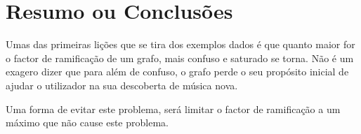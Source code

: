 



\section{Resumo ou Conclusões}

Umas das primeiras lições que se tira dos exemplos dados é que quanto maior for o factor de ramificação de um grafo, mais confuso e saturado se torna.
Não é um exagero dizer que para além de confuso, o grafo perde o seu propósito inicial de ajudar o utilizador na sua descoberta de música nova.

Uma forma de evitar este problema, será limitar o factor de ramificação a um máximo que não cause este problema.

